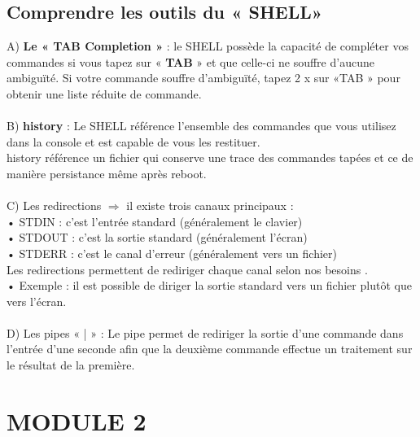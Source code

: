 \documentclass[a4paper, 12pt, french]{book}
\begin{document}
\section{\Large  Comprendre les outils du « SHELL»}
A) \textbf{Le « TAB Completion »} : le SHELL possède la capacité de compléter vos
commandes si vous tapez sur « \textbf{TAB} » et que celle-ci ne souffre d’aucune
ambiguïté. Si votre commande souffre d’ambiguïté, tapez 2 x sur «TAB » pour
obtenir une liste réduite de commande.\\\\
B) \textbf{history} : Le SHELL référence l’ensemble des commandes que vous
utilisez dans la console et est capable de vous les restituer.\\
history référence un fichier qui conserve une trace des commandes
tapées et ce de manière persistance même après reboot.\\\\
C) Les redirections $\Rightarrow$ il existe trois canaux principaux : \\

	• STDIN : c’est l’entrée standard (généralement le clavier)\\
	
	• STDOUT : c’est la sortie standard (généralement l’écran)\\
	
	• STDERR : c’est le canal d’erreur (généralement vers un fichier)\\
	
Les redirections permettent de rediriger chaque canal selon nos besoins .\\

	• Exemple : il est possible de diriger la sortie standard vers un fichier plutôt que vers l’écran.\\\\
D) Les pipes « | » :
Le pipe permet de rediriger la sortie d’une commande dans l’entrée d’une seconde afin que la deuxième commande effectue un traitement sur le résultat de la première.
\chapter{MODULE 2}
\end{document}
